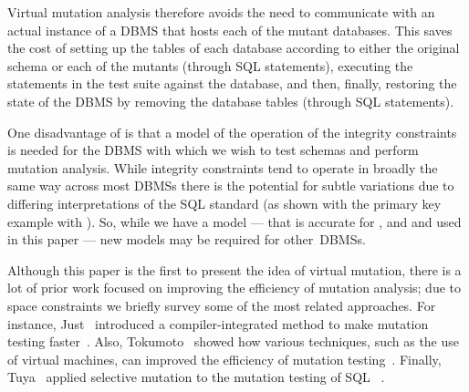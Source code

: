 
Virtual mutation analysis therefore avoids the need to communicate with an actual instance of a DBMS that hosts each of the mutant databases. This saves the cost of setting up the tables of each database according to either the original schema or each of the mutants (through SQL  statements), executing the \INSERT statements in the test suite against the database, and then, finally, restoring the state of the DBMS by removing the database tables (through SQL  statements).

One disadvantage of \vma is that a model of the operation of the integrity constraints is needed for the DBMS with which we wish to test schemas and perform mutation analysis. While integrity constraints tend to operate in broadly the same way across most DBMSs there is the potential for subtle variations due to differing interpretations of the SQL standard (as shown with the primary key example with \SQLite). So, while we have a model --- that is accurate for \HyperSQL, \Postgres and \SQLite and used in this paper --- new models may be required for \mbox{other DBMSs}.

 Although this paper is the first to present the idea of virtual mutation, there is a lot of prior work focused on improving the efficiency of mutation analysis; due to space constraints we briefly survey some of the most related approaches. For instance, Just \etal~introduced a compiler-integrated method to make mutation testing faster~\cite{Just2011}. Also, Tokumoto \etal~showed how various techniques, such as the use of virtual machines, can improved the efficiency of mutation testing~\cite{Tokumoto2016}. Finally, Tuya \etal~applied selective mutation to the mutation testing of SQL \SELECTs~\cite{Tuya2007}.


